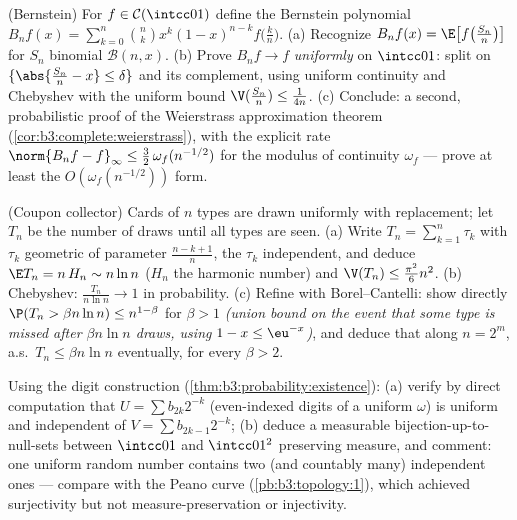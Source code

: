 \begin{exercise}[$\star\star\star$]\label{exo:b3:probability:8}
(Bernstein) For $f \in \mathcal C(\intcc01)$ define the
Bernstein polynomial $B_nf(x) =
\sum_{k=0}^n\binom nkx^k(1-x)^{n-k}f\bigl(\frac kn\bigr)$.
(a) Recognize $B_nf(x) = \E\bigl[f\bigl(\frac
{S_n}n\bigr)\bigr]$ for $S_n$ binomial $\mathcal B(n, x)$.
(b) Prove $B_nf \to f$ \emph{uniformly} on $\intcc01$: split
on $\{\abs{\frac{S_n}n - x} \leq \delta\}$ and its
complement, using uniform continuity and Chebyshev with the
uniform bound $\V(\frac{S_n}n) \leq \frac1{4n}$.
(c) Conclude: a second, probabilistic proof of the
Weierstrass approximation theorem
(\cref{cor:b3:complete:weierstrass}), with the explicit rate
$\norm{B_nf - f}_\infty \leq \frac32\,\omega_f(n^{-1/2})$
for the modulus of continuity $\omega_f$ --- prove at least
the $O(\omega_f(n^{-1/2}))$ form.
\end{exercise}

\begin{exercise}[$\star\star\star$]\label{exo:b3:probability:9}
(Coupon collector) Cards of $n$ types are drawn uniformly
with replacement; let $T_n$ be the number of draws until all
types are seen.
(a) Write $T_n = \sum_{k=1}^{n}\tau_k$ with $\tau_k$
geometric of parameter $\frac{n - k + 1}n$, the $\tau_k$
independent, and deduce $\E T_n = n\,H_n \sim n\ln n$
($H_n$ the harmonic number) and $\V(T_n) \leq
\frac{\pi^2}6n^2$.
(b) Chebyshev: $\frac{T_n}{n\ln n} \to 1$ in probability.
(c) Refine with Borel--Cantelli: show directly $\P(T_n >
\beta n\ln n) \leq n^{1 - \beta}$ for $\beta > 1$
\emph{(union bound on the event that some type is missed
after $\beta n\ln n$ draws, using $1 - x \leq \eu^{-x}$)},
and deduce that along $n = 2^m$, a.s.\ $T_n \leq \beta n\ln
n$ eventually, for every $\beta > 2$.
\end{exercise}

\begin{exercise}[$\star\star$]\label{exo:b3:probability:10}
Using the digit construction
(\cref{thm:b3:probability:existence}):
(a) verify by direct computation that $U = \sum b_{2k}2^{-k}$
(even-indexed digits of a uniform $\omega$) is uniform and
independent of $V = \sum b_{2k-1}2^{-k}$;
(b) deduce a measurable bijection-up-to-null-sets between
$\intcc01$ and $\intcc01^2$ preserving measure, and comment:
one uniform random number contains two (and countably many)
independent ones --- compare with the Peano curve
(\cref{pb:b3:topology:1}), which achieved surjectivity but
not measure-preservation or injectivity.
\end{exercise}


